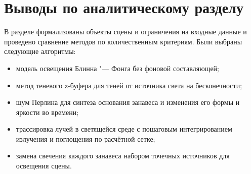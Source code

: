 \section*{Выводы по аналитическому разделу}

В разделе формализованы объекты сцены и ограничения на входные данные и проведено сравнение методов по количественным критериям. Были выбраны следующие алгоритмы:
\begin{itemize}
	\item модель освещения Блинна "--- Фонга без фоновой составляющей;
	\item метод теневого z-буфера для теней от источника света на бесконечности;
	\item шум Перлина для синтеза основания занавеса и изменения его формы и яркости во времени;
	\item трассировка лучей в светящейся среде с пошаговым интегрированием излучения и поглощения по расчётной сетке;
	\item замена свечения каждого занавеса набором точечных источников для освещения сцены.
\end{itemize}